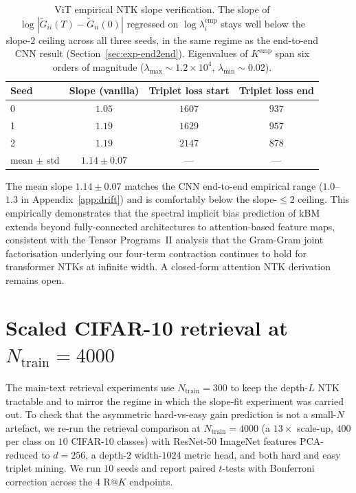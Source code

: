 \documentclass{article}
\newcommand{\Gtilde}{\widetilde{G}}
\begin{document}
\begin{table}[!htbp]
\centering
\small
\caption{ViT empirical NTK slope verification. The slope of
$\log|\Gtilde_{ii}(T) - \Gtilde_{ii}(0)|$ regressed on
$\log\lambda_i^{\mathrm{emp}}$ stays well below the slope-$2$ ceiling
across all three seeds, in the same regime as the end-to-end CNN
result (Section~\ref{sec:exp-end2end}). Eigenvalues of
$K^{\mathrm{emp}}$ span six orders of magnitude
($\lambda_{\max}\sim 1.2{\times}10^4$, $\lambda_{\min}\sim 0.02$).}
\label{tab:vit}
\begin{tabular}{lccc}
\toprule
Seed & Slope (vanilla) & Triplet loss start & Triplet loss end \\
\midrule
0 & $1.05$ & $1607$ & $937$ \\
1 & $1.19$ & $1629$ & $957$ \\
2 & $1.19$ & $2147$ & $878$ \\
\midrule
mean $\pm$ std & $1.14 \pm 0.07$ & --- & --- \\
\bottomrule
\end{tabular}
\end{table}

The mean slope $1.14 \pm 0.07$ matches the CNN end-to-end empirical
range ($1.0$--$1.3$ in Appendix~\ref{app:drift}) and is comfortably
below the slope-$\le 2$ ceiling. This empirically demonstrates that
the spectral implicit bias prediction of kBM extends beyond
fully-connected architectures to attention-based feature maps,
consistent with the Tensor Programs~II analysis
\citep{yang2020tensor} that the Gram-Gram joint factorisation
underlying our four-term contraction continues to hold for transformer
NTKs at infinite width. A closed-form attention NTK derivation
remains open.

\section{Scaled CIFAR-10 retrieval at $N_{\mathrm{train}}=4000$}
\label{app:scaled}

The main-text retrieval experiments use $N_{\mathrm{train}}=300$ to keep
the depth-$L$ NTK tractable and to mirror the regime in which the
slope-fit experiment was carried out. To check that the asymmetric
hard-vs-easy gain prediction is not a small-$N$ artefact, we re-run the
retrieval comparison at $N_{\mathrm{train}}=4000$ (a $13\times$ scale-up,
$400$ per class on $10$ CIFAR-10 classes) with ResNet-50 ImageNet
features PCA-reduced to $d=256$, a depth-$2$ width-$1024$ metric head,
and both hard and easy triplet mining. We run $10$ seeds and report
paired $t$-tests with Bonferroni correction across the 4
$\text{R@}K$ endpoints.
\end{document}
